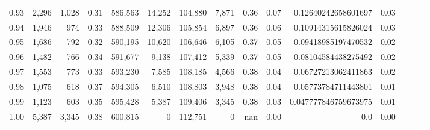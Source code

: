 \begin{tabular}{rrrrrrrrrrrrrrr}
0.93 &   2,296 &  1,028 &  0.31 &  586,563 &   14,252 &  104,880 &    7,871 &  0.36 &  0.07 &   0.12640242658601697 &      0.03 \\
0.94 &   1,946 &    974 &  0.33 &  588,509 &   12,306 &  105,854 &    6,897 &  0.36 &  0.06 &   0.10914315615826024 &      0.03 \\
0.95 &   1,686 &    792 &  0.32 &  590,195 &   10,620 &  106,646 &    6,105 &  0.37 &  0.05 &   0.09418985197470532 &      0.02 \\
0.96 &   1,482 &    766 &  0.34 &  591,677 &    9,138 &  107,412 &    5,339 &  0.37 &  0.05 &   0.08104584438275492 &      0.02 \\
0.97 &   1,553 &    773 &  0.33 &  593,230 &    7,585 &  108,185 &    4,566 &  0.38 &  0.04 &   0.06727213062411863 &      0.02 \\
0.98 &   1,075 &    618 &  0.37 &  594,305 &    6,510 &  108,803 &    3,948 &  0.38 &  0.04 &   0.05773784711443801 &      0.01 \\
0.99 &   1,123 &    603 &  0.35 &  595,428 &    5,387 &  109,406 &    3,345 &  0.38 &  0.03 &  0.047777846759673975 &      0.01 \\
1.00 &   5,387 &  3,345 &  0.38 &  600,815 &        0 &  112,751 &        0 &   nan &  0.00 &                   0.0 &      0.00 \\
\bottomrule
\end{tabular}
